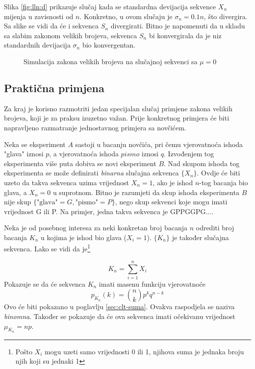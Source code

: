 Slika \ref{fig:lln:d} prikazuje slučaj kada se standardna devijacija sekvence
$X_n$ mijenja u zavisnosti od $n$. Konkretno, u ovom slučaju je $\sigma_n =
0.1n$, što divergira. Sa slike se vidi da će i sekvenca $S_n$ divergirati. Bitno
je napomenuti da u skladu sa slabim zakonom velikih brojeva, sekvenca $S_n$ bi
konvergirala da je niz standardnih devijacija $\sigma_n$ bio konvergentan.

\begin{figure}[H]
  \centering
	\caption{Simulacija zakona velikih brojeva na slučajnoj sekvenci sa $\mu=0$}
  \label{fig:lln}
\end{figure}

\subsection{Praktična primjena}

Za kraj je korisno razmotriti jedan specijalan slučaj primjene zakona velikih
brojeva, koji je za praksu izuzetno važan. Prije konkretnog primjera će biti
napravljeno razmatranje jednostavnog primjera sa novčićem.

Neka se eksperiment $A$ sastoji u bacanju novčića, pri čemu vjerovatnoća ishoda
"glava" iznosi $p$, a vjerovatnoća ishoda $pismo$ iznosi $q$. Izvođenjem tog
eksperimenta više puta dobiva se novi eksperiment $B$. Nad skupom ishoda tog
eksperimenta se može definirati \textit{binarna} slučajna sekvenca $\{X_n\}$.
Ovdje će biti uzeto da takva sekvenca uzima vrijednost $X_n=1$, ako je ishod
$n$-tog bacanja bio glava, a $X_n=0$ u suprotnom. Bitno je razumjeti da skup
ishoda eksperimenta $B$ nije skup $\{\text{"glava"}=G, \text{"pismo"}=P\}$, nego
skup sekvenci koje mogu imati vrijednost G ili P. Na primjer, jedna takva
sekvenca je GPPGGPG....

Neka je od posebnog interesa za neki konkretan broj bacanja $n$ odrediti broj
bacanja $K_n$ u kojima je ishod bio glava ($X_i=1$). $\{K_n\}$ je također
slučajna sekvenca. Lako se vidi da je\footnote{Pošto $X_i$ mogu uzeti samo
  vrijednosti 0 ili 1, njihova suma je jednaka broju njih koji su jednaki 1}

\begin{equation}
  K_n = \sum_{i=1}^{n} X_i 
\end{equation}
%
Pokazuje se da će sekvenca $K_n$ imati masenu funkciju vjerovatnoće
\begin{equation}
  p_{K_n}(k) = \binom{n}{k} p^k q^{n-k}
\end{equation}
%
Ovo će biti pokazano u poglavlju \ref{sec:clt-suma}.  Ovakva raspodjela se
naziva \textit{binomna}. Također se pokazuje da će ova sekvenca imati očekivanu
vrijednost $\mu_{K_n}=np$.


